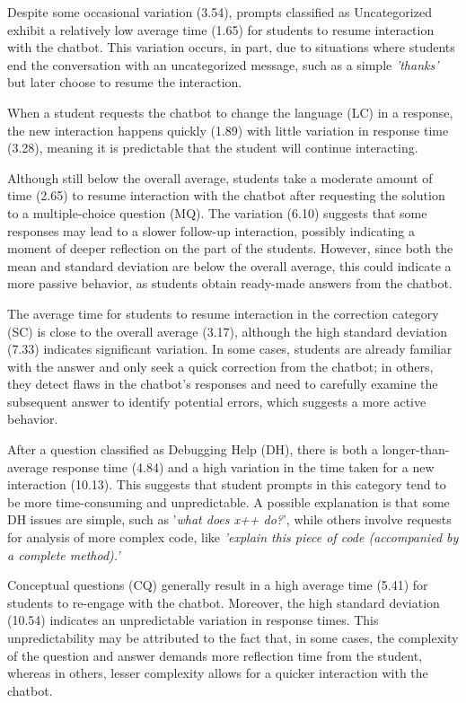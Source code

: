 \documentclass[a4paper,twoside]{article}
\begin{document}
Despite some occasional variation (3.54), prompts classified as Uncategorized
exhibit a relatively low average time (1.65) for students to resume interaction
with the chatbot. This variation occurs, in part, due to situations where students
end the conversation with an uncategorized message, such as a simple
\textit{'thanks'} but later choose to resume the interaction.

When a student requests the chatbot to change the language (LC) in a response, the
new interaction happens quickly (1.89) with little variation in response time
(3.28), meaning it is predictable that the student will continue interacting.

Although still below the overall average, students take a moderate amount of
time (2.65) to resume interaction with the chatbot after requesting the solution to
a multiple-choice question (MQ). The variation (6.10) suggests that some
responses may lead to a slower follow-up interaction, possibly indicating a
moment of deeper reflection on the part of the students. However, since both the
mean and standard deviation are below the overall average, this could indicate
a more passive behavior, as students obtain ready-made answers from the chatbot.

The average time for students to resume interaction in the correction category
(SC) is close to the overall average (3.17), although the high standard
deviation (7.33) indicates significant variation. In some cases, students are
already familiar with the answer and only seek a quick correction from the chatbot;
in others, they detect flaws in the chatbot's responses and need to carefully
examine the subsequent answer to identify potential errors, which suggests a
more active behavior.

After a question classified as Debugging Help (DH), there is both a
longer-than-average response time (4.84) and a high variation in the time taken
for a new interaction (10.13). This suggests that student prompts in this
category tend to be more time-consuming and unpredictable. A possible
explanation is that some DH issues are simple, such as '\textit{what does x++ do?}',
while others involve requests for analysis of more complex code, like
\textit{'explain this piece of code (accompanied by a complete method).'}

Conceptual questions (CQ) generally result in a high average time (5.41) for
students to re-engage with the chatbot. Moreover, the high standard deviation
(10.54) indicates an unpredictable variation in response times. This
unpredictability may be attributed to the fact that, in some cases, the
complexity of the question and answer demands more reflection time from the
student, whereas in others, lesser complexity allows for a quicker interaction
with the chatbot.
\end{document}
